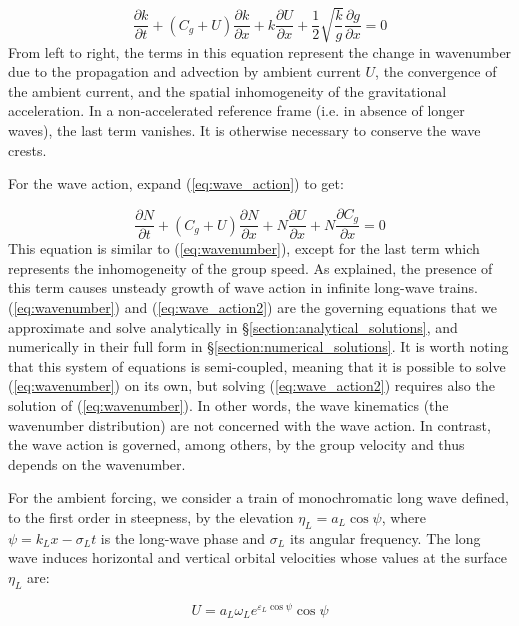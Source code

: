 \documentclass[lineno]{jfm}
\begin{document}
\begin{equation}
\label{eq:wavenumber}
\dfrac{\partial k}{\partial t}
+ \left(C_g + U\right) \dfrac{\partial k}{\partial x}
+ k \dfrac{\partial U}{\partial x}
+ \dfrac{1}{2} \sqrt{\dfrac{k}{g}} \dfrac{\partial g}{\partial x}
= 0
\end{equation}
From left to right, the terms in this equation represent the change in wavenumber
due to the propagation and advection by ambient current $U$, the convergence of
the ambient current, and the spatial inhomogeneity of the gravitational acceleration.
In a non-accelerated reference frame (i.e. in absence of longer waves), the last
term vanishes.
It is otherwise necessary to conserve the wave crests.

For the wave action, expand (\ref{eq:wave_action}) to get:

\begin{equation}
\label{eq:wave_action2}
\dfrac{\partial N}{\partial t}
+ \left(C_g + U\right) \dfrac{\partial N}{\partial x}
+ N \dfrac{\partial U}{\partial x}
+ N \dfrac{\partial C_g}{\partial x}
= 0
\end{equation}
This equation is similar to (\ref{eq:wavenumber}), except for the last term
which represents the inhomogeneity of the group speed.
As \citet{peureux2021unsteady} explained, the presence of this term causes
unsteady growth of wave action in infinite long-wave trains.
(\ref{eq:wavenumber}) and (\ref{eq:wave_action2}) are the governing equations
that we approximate and solve analytically in \S\ref{section:analytical_solutions},
and numerically in their full form in \S\ref{section:numerical_solutions}.
It is worth noting that this system of equations is semi-coupled, meaning that
it is possible to solve (\ref{eq:wavenumber}) on its own, but solving
(\ref{eq:wave_action2}) requires also the solution of (\ref{eq:wavenumber}).
In other words, the wave kinematics (the wavenumber distribution) are not
concerned with the wave action.
In contrast, the wave action is governed, among others, by the
group velocity and thus depends on the wavenumber.

For the ambient forcing, we consider a train of monochromatic long wave
defined, to the first order in steepness, by the elevation $\eta_L = a_L \cos{\psi}$,
where $\psi = k_L x - \sigma_L t$ is the long-wave phase and $\sigma_L$ its
angular frequency.
The long wave induces horizontal and vertical orbital velocities whose values
at the surface $\eta_L$ are:

\begin{equation}
\label{eq:U_L}
U = a_L \omega_L e^{\varepsilon_L \cos{\psi}} \cos{\psi}
\end{equation}
\end{document}
